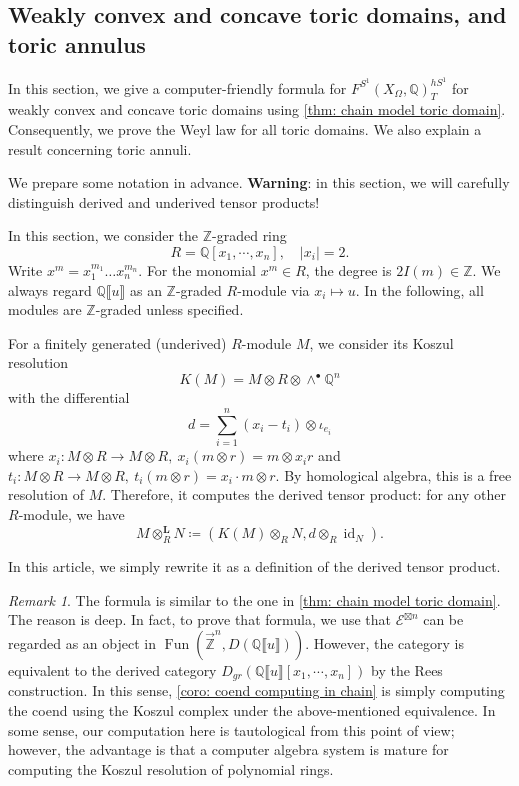\documentclass[11pt]{amsart}
\numberwithin{equation}{section}
\theoremstyle{plain}
\theoremstyle{definition}
\theoremstyle{remark}
\newtheorem{RMK}[rmk]{Remark}
\newcommand{\bQ} { {\mathbb{Q}}}
\newcommand{\bZ} { {\mathbb{Z}}}
\newcommand{\cE} { {\mathcal{E}}}
\newcommand{\id}{{\operatorname{id}}}
\newcommand{\fpw}[1]{{\llbracket #1\rrbracket}}
\newcommand\Fun{\operatorname{Fun}}
\newcommand{\rarbZ} { \overrightarrow{\mathbb{Z}}}
\begin{document}
\subsection{Weakly convex and concave toric domains, and toric annulus}\label{section:convex and concave toric domains}

In this section, we give a computer-friendly formula for $F^{S^1}(X_\Omega,\bQ)_T^{hS^1}$ for weakly convex and concave toric domains using \autoref{thm: chain model toric domain}. Consequently, we prove the Weyl law for all toric domains. We also explain a result concerning toric annuli.

We prepare some notation in advance. \textbf{Warning}: in this section, we will carefully distinguish derived and underived tensor products!


In this section, we consider the $\bZ$-graded ring
\[R=\bQ[x_1,\cdots, x_n],\quad |x_i|=2.\]
Write $x^m = x_1^{m_1} \dots x_n^{m_n}$. For the monomial $x^m\in R$, the degree is $2I(m)\in \bZ$. We always regard $\bQ\fpw{u}$ as an $\bZ$-graded $R$-module via $x_i\mapsto u$. In the following, all modules are $\bZ$-graded unless specified.

For a finitely generated (underived) $R$-module $M$, we consider its Koszul resolution
\[K(M)=M\otimes R\otimes\wedge^\bullet\bQ^n\]
with the differential
\begin{equation}\label{equation: differential Koszul}d=\sum_{i=1}^n  (x_i - t_i)\otimes \iota_{e_i}\end{equation}
where $x_i:M\otimes R \to M\otimes R, ~x_i(m\otimes r)=m\otimes x_ir$ and  $t_i:M\otimes R \to M\otimes R, ~t_i(m\otimes r)=x_i\cdot m\otimes r$. 
By homological algebra, this is a free resolution of $M$. Therefore, it computes the derived tensor product: for any other $R$-module, we have
\begin{equation}\label{equatiuon: definition of derived tensor over polynomial using Koszul}
    M\otimes_{R}^{\mathbf L}N \coloneqq (K(M) \otimes_R N,d\otimes_R \id_N ).
\end{equation}

In this article, we simply rewrite it as a definition of the derived tensor product.
\begin{RMK}
    The formula is similar to the one in \autoref{thm: chain model toric domain}. The reason is deep. In fact, to prove that formula, we use that $\cE^{\boxtimes n}$ can be regarded as an object in $\Fun(\rarbZ^n,D(\bQ\fpw{u}))$. However, the category is equivalent to the derived category $D_{gr}(\bQ\fpw{u}[x_1,\cdots, x_n])$ by the Rees construction. In this sense, \autoref{coro: coend computing in chain} is simply computing the coend using the Koszul complex under the above-mentioned equivalence. In some sense, our computation here is tautological from this point of view; however, the advantage is that a computer algebra system is mature for computing the Koszul resolution of polynomial rings.
\end{RMK}
\end{document}
